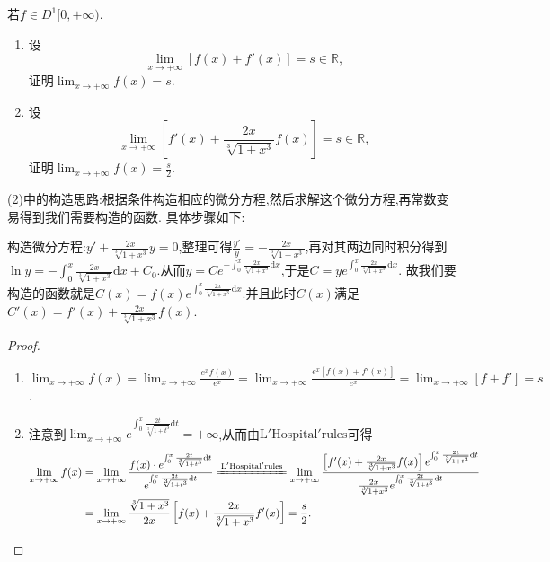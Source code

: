 \documentclass[../../main.tex]{subfiles}
\begin{document}
\begin{example}
若\(f\in D^1[0,+\infty)\).
\begin{enumerate}[(1)]
\item 设
\[
\lim_{x\rightarrow +\infty}[f(x)+f'(x)] = s\in\mathbb{R},
\]
证明\(\lim_{x\rightarrow +\infty}f(x)=s\).

\item 设
\[
\lim_{x\rightarrow +\infty}\left[f'(x)+\frac{2x}{\sqrt[3]{1 + x^{3}}}f(x)\right]=s\in\mathbb{R},
\]
证明\(\lim_{x\rightarrow +\infty}f(x)=\frac{s}{2}\).
\end{enumerate}
\end{example}
\begin{note}
(2)中的构造思路:根据条件构造相应的微分方程,然后求解这个微分方程,再常数变易得到我们需要构造的函数. 具体步骤如下:

构造微分方程:\(y'+\frac{2x}{\sqrt[3]{1 + x^3}}y = 0\),整理可得\(\frac{y'}{y}=-\frac{2x}{\sqrt[3]{1 + x^3}}\),再对其两边同时积分得到\(\ln y = -\int_{0}^{x}\frac{2x}{\sqrt[3]{1 + x^3}}\mathrm{d}x + C_0\).从而\(y = Ce^{-\int_{0}^{x}\frac{2x}{\sqrt[3]{1 + x^3}}\mathrm{d}x}\),于是\(C = ye^{\int_{0}^{x}\frac{2x}{\sqrt[3]{1 + x^3}}\mathrm{d}x}\).
故我们要构造的函数就是\(C(x) = f(x)e^{\int_{0}^{x}\frac{2x}{\sqrt[3]{1 + x^3}}\mathrm{d}x}\).并且此时$C(x)$满足$C'\left( x \right) =f'\left( x \right) +\frac{2x}{\sqrt[3]{1+x^3}}f\left( x \right)$.
\end{note}
\begin{proof}
\begin{enumerate}[(1)]
\item $\lim_{x\rightarrow +\infty}f(x) = \lim_{x\rightarrow +\infty}\frac{e^{x}f(x)}{e^{x}}
=\lim_{x\rightarrow +\infty}\frac{e^{x}[f(x)+f'(x)]}{e^{x}}
=\lim_{x\rightarrow +\infty}[f + f']
=s$.

\item 注意到$\lim_{x\rightarrow +\infty} e^{\int_0^x{\frac{2t}{\sqrt[3]{1+t^3}}\mathrm{d}t}}=+\infty$,从而由$\mathrm{L}'\mathrm{Hospital}'\mathrm{rules}$可得
\begin{align*}
\lim_{x\rightarrow +\infty} f(x)&=\lim_{x\rightarrow +\infty} \frac{f(x)\cdot e^{\int_0^x{\frac{2t}{\sqrt[3]{1+t^3}}\mathrm{d}t}}}{e^{\int_0^x{\frac{2t}{\sqrt[3]{1+t^3}}\mathrm{d}t}}}\xlongequal[]{\mathrm{L}'\mathrm{Hospital}'\mathrm{rules}}\lim_{x\rightarrow +\infty} \frac{\left[ f'(x)+\frac{2x}{\sqrt[3]{1+x^3}}f(x) \right] e^{\int_0^x{\frac{2t}{\sqrt[3]{1+t^3}}\mathrm{d}t}}}{\frac{2x}{\sqrt[3]{1+x^3}}e^{\int_0^x{\frac{2t}{\sqrt[3]{1+t^3}}\mathrm{d}t}}}
\\
&=\lim_{x\rightarrow +\infty} \frac{\sqrt[3]{1+x^3}}{2x}\left[ f(x)+\frac{2x}{\sqrt[3]{1+x^3}}f'(x) \right] =\frac{s}{2}.
\end{align*}
\end{enumerate}
\end{proof}
\end{document}
